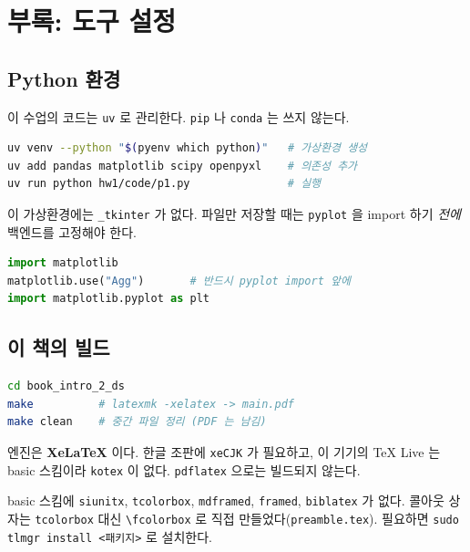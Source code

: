 \chapter{부록: 도구 설정}
\label{ch:toolchain}

\section{Python 환경}
\label{sec:python-env}

이 수업의 코드는 \texttt{uv} 로 관리한다. \texttt{pip} 나 \texttt{conda} 는 쓰지
않는다.

\begin{lstlisting}[language=bash]
uv venv --python "$(pyenv which python)"   # 가상환경 생성
uv add pandas matplotlib scipy openpyxl    # 의존성 추가
uv run python hw1/code/p1.py               # 실행
\end{lstlisting}

\begin{pitfall}
이 가상환경에는 \texttt{\_tkinter} 가 없다. 파일만 저장할 때는 \texttt{pyplot} 을
import 하기 \emph{전에} 백엔드를 고정해야 한다.

\begin{lstlisting}[language=Python]
import matplotlib
matplotlib.use("Agg")       # 반드시 pyplot import 앞에
import matplotlib.pyplot as plt
\end{lstlisting}
\end{pitfall}

\section{이 책의 빌드}
\label{sec:book-build}

\begin{lstlisting}[language=bash]
cd book_intro_2_ds
make          # latexmk -xelatex -> main.pdf
make clean    # 중간 파일 정리 (PDF 는 남김)
\end{lstlisting}

엔진은 \textbf{XeLaTeX} 이다. 한글 조판에 \texttt{xeCJK} 가 필요하고, 이 기기의
TeX Live 는 basic 스킴이라 \texttt{kotex} 이 없다. \texttt{pdflatex} 으로는
빌드되지 않는다.

\begin{aside}[없는 패키지와 그 대체]
basic 스킴에 \texttt{siunitx}, \texttt{tcolorbox}, \texttt{mdframed},
\texttt{framed}, \texttt{biblatex} 가 없다. 콜아웃 상자는 \texttt{tcolorbox} 대신
\texttt{\textbackslash fcolorbox} 로 직접 만들었다(\texttt{preamble.tex}).
필요하면 \texttt{sudo tlmgr install <패키지>} 로 설치한다.
\end{aside}


